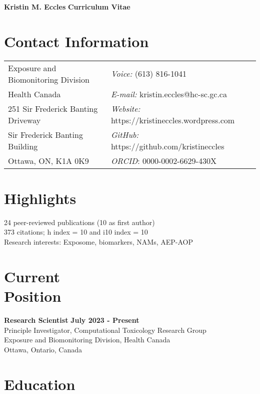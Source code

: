 \documentclass[margin,line]{res}
\begin{document}
\begin{flushleft}
		\huge \textbf{Kristin M. Eccles}
		\hfill {\LARGE \textbf{Curriculum Vitae}}\\
\end{flushleft}


\begin{resume}
\section{\sc Contact Information}
\vspace{.05in}
\begin{tabular}{@{}p{3.2in}p{2.5in}}
Exposure and Biomonitoring Division & {\it Voice:}  (613) 816-1041 \\
Health Canada & {\it E-mail:}  kristin.eccles@hc-sc.gc.ca\\
251 Sir Frederick Banting Driveway&{\it Website:} https://kristineccles.wordpress.com  \\
Sir Frederick Banting Building&{\it GitHub:} https://github.com/kristineccles \\
Ottawa, ON, K1A 0K9 & {\it ORCID}: 0000-0002-6629-430X

\end{tabular}

\vspace*{.1in}
\section{\sc Highlights}
24 peer-reviewed publications (10 as first author)
\\
373 citations; h index = 10 and i10 index = 10
\\
Research interests: Exposome, biomarkers, NAMs, AEP-AOP

\vspace*{.1in}
\section{\sc Current\\Position}
{\bf  Research Scientist} \hfill {\bf July 2023 - Present}\\
Principle Investigator, Computational Toxicology Research Group\\
Exposure and Biomonitoring Division, Health Canada\\
Ottawa, Ontario, Canada

\vspace*{.1in}
\section{\sc Education}


\end{resume}
\end{document}

